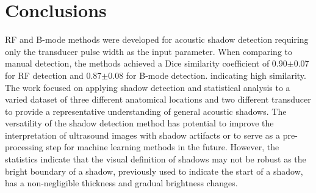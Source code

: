 \documentclass[preprint,5p,authoryear]{elsarticle}
\begin{document}
\section*{Conclusions}
\label{Conclusions}
RF and B-mode methods were developed for acoustic shadow detection requiring only the transducer pulse width as the input parameter. When comparing to manual detection, the methods achieved a Dice similarity coefficient of 0.90$\pm$0.07 for RF detection and 0.87$\pm$0.08 for B-mode detection. indicating high similarity. The work focused on applying shadow detection and statistical analysis to a varied dataset of three different anatomical locations and two different transducer to provide a representative understanding of general acoustic shadows. The versatility of the shadow detection method has potential to improve the interpretation of ultrasound images with shadow artifacts or to serve as a pre-processing step for machine learning methods in the future. However, the statistics indicate that the visual definition of shadows may not be robust as the bright boundary of a shadow, previously used to indicate the start of a shadow, has a non-negligible thickness and gradual brightness changes. 

        







\end{document}
